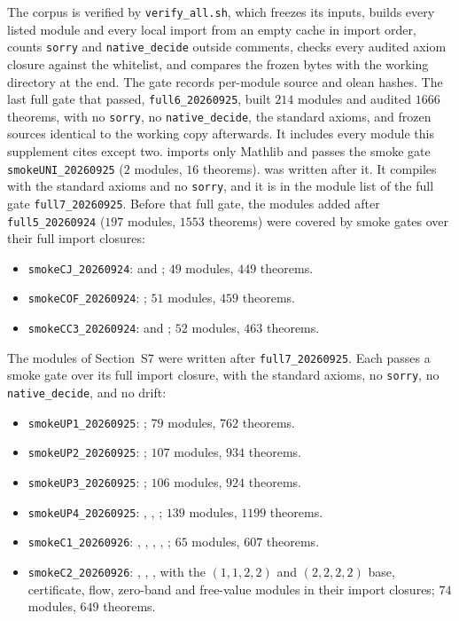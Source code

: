The corpus is verified by \texttt{verify\_all.sh}, which freezes its inputs, builds every
listed module and every local import from an empty cache in import order, counts
\texttt{sorry} and \texttt{native\_decide} outside comments, checks every audited axiom
closure against the whitelist, and compares the frozen bytes with the working directory at
the end. The gate records per-module source and olean hashes. The last full gate that passed,
\texttt{full6\_20260925}, built $214$ modules and audited $1666$ theorems, with no
\texttt{sorry}, no \texttt{native\_decide}, the standard axioms, and frozen sources identical to
the working copy afterwards. It includes every module this supplement cites except two.
 imports only Mathlib and passes the smoke gate
\texttt{smokeUNI\_20260925} ($2$ modules, $16$ theorems).  was
written after it. It compiles with the standard axioms and no \texttt{sorry}, and it is in the
module list of the full gate \texttt{full7\_20260925}. Before that full gate, the modules
added after \texttt{full5\_20260924} ($197$ modules, $1553$ theorems) were covered by smoke gates
over their full import closures:
\begin{itemize}
\item \texttt{smokeCJ\_20260924}:  and
; $49$ modules, $449$ theorems.
\item \texttt{smokeCOF\_20260924}: ; $51$ modules, $459$
theorems.
\item \texttt{smokeCC3\_20260924}:  and
; $52$ modules, $463$ theorems.
\end{itemize}
The modules of Section~S7 were written after \texttt{full7\_20260925}. Each passes a smoke gate
over its full import closure, with the standard axioms, no \texttt{sorry}, no
\texttt{native\_decide}, and no drift:
\begin{itemize}
\item \texttt{smokeUP1\_20260925}: ; $79$ modules, $762$ theorems.
\item \texttt{smokeUP2\_20260925}: ; $107$ modules, $934$ theorems.
\item \texttt{smokeUP3\_20260925}: ; $106$ modules, $924$ theorems.
\item \texttt{smokeUP4\_20260925}: , ,
; $139$ modules, $1199$ theorems.
\item \texttt{smokeC1\_20260926}: , ,
, , ;
$65$ modules, $607$ theorems.
\item \texttt{smokeC2\_20260926}: , ,
, with the $(1,1,2,2)$ and $(2,2,2,2)$ base, certificate, flow,
zero-band and free-value modules in their import closures; $74$ modules, $649$ theorems.
\end{itemize}


